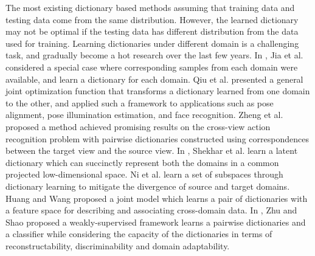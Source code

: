 \documentclass{article}
\begin{document}
The most existing dictionary based methods assuming that training data and testing data come from the same distribution. However, the learned dictionary may not be optimal if the testing data has different distribution from the data used for training. Learning dictionaries under different domain is a challenging task, and gradually become a hot research over the last few years. In \cite{jia2010factorized}, Jia et al. considered a special case where corresponding samples from each domain were available, and learn a dictionary for each domain. Qiu et al. \cite{qiu2012domain} presented a general joint optimization function that transforms a dictionary learned from one domain to the other, and applied such a framework to applications such as pose alignment, pose illumination estimation, and face recognition. Zheng et al. \cite{zheng2012cross} proposed a method achieved promising results on the cross-view action recognition problem with pairwise dictionaries constructed using correspondences between the target view and the source view. In \cite{shekhar2013generalized}, Shekhar et al. learn a latent dictionary which can succinctly represent both the domains in a common projected low-dimensional space. Ni et al. \cite{ni2013subspace} learn a set of subspaces through dictionary learning to mitigate the divergence of source and target domains. Huang and Wang \cite{huang2013coupled} proposed a joint model which learns a pair of dictionaries with a feature space for describing and associating cross-domain data. In \cite{zhu2013enhancing,zhu2014weakly}, Zhu and Shao proposed a weakly-supervised framework learns a pairwise dictionaries and a classifier while considering the capacity of the dictionaries in terms of reconstructability, discriminability and domain adaptability.
\end{document}
